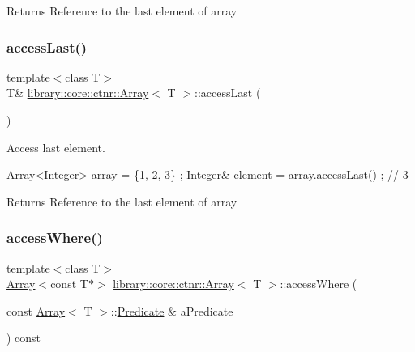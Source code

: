\begin{DoxyReturn}{Returns}
Reference to the last element of array 
\end{DoxyReturn}
\mbox{\label{classlibrary_1_1core_1_1ctnr_1_1_array_ad6ea47ab09dfeebd6de0878d3ad2de25}} 
\subsubsection{\texorpdfstring{access\+Last()}{accessLast()}\hspace{0.1cm}{\footnotesize\ttfamily [2/2]}}
{\footnotesize\ttfamily template$<$class T$>$ \\
T\& \hyperlink{classlibrary_1_1core_1_1ctnr_1_1_array}{library\+::core\+::ctnr\+::\+Array}$<$ T $>$\+::access\+Last (\begin{DoxyParamCaption}{ }\end{DoxyParamCaption})}



Access last element. 


\begin{DoxyCode}
Array<Integer> array = \{1, 2, 3\} ;
Integer& element = array.accessLast() ; \textcolor{comment}{// 3}
\end{DoxyCode}


\begin{DoxyReturn}{Returns}
Reference to the last element of array 
\end{DoxyReturn}
\mbox{\label{classlibrary_1_1core_1_1ctnr_1_1_array_a5359c59d344a6147c7c6ea1012411011}} 
\subsubsection{\texorpdfstring{access\+Where()}{accessWhere()}}
{\footnotesize\ttfamily template$<$class T$>$ \\
\hyperlink{classlibrary_1_1core_1_1ctnr_1_1_array}{Array}$<$const T$\ast$$>$ \hyperlink{classlibrary_1_1core_1_1ctnr_1_1_array}{library\+::core\+::ctnr\+::\+Array}$<$ T $>$\+::access\+Where (\begin{DoxyParamCaption}\item[{const \hyperlink{classlibrary_1_1core_1_1ctnr_1_1_array}{Array}$<$ T $>$\+::\hyperlink{classlibrary_1_1core_1_1ctnr_1_1_array_a74cd325a740870aea490b6b739aa06ae}{Predicate} \&}]{a\+Predicate }\end{DoxyParamCaption}) const}



